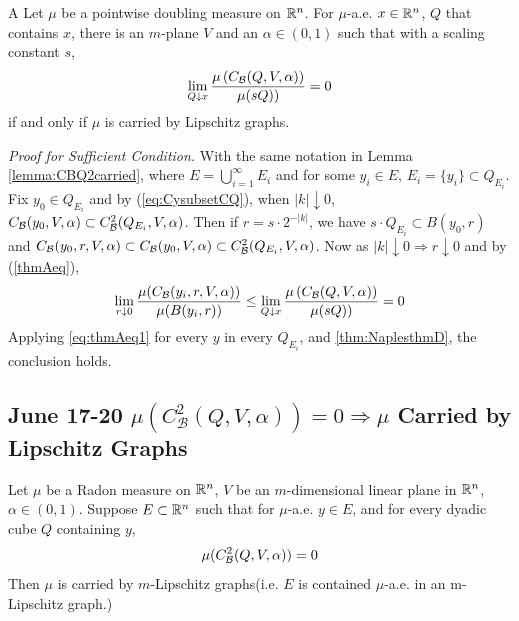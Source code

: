 \begin{customthm}{A}\label{thmA} 
    Let $\mu$ be a pointwise doubling measure on $\mathbb{R}^n$. For $\mu$-a.e. $x \in \mathbb{R}^n$, $Q$ that contains $x$, there is an $m$-plane $V$ and an $\alpha \in(0,1)$ such that with a scaling constant $s$,
    \begin{equation}\label{thmAeq}
        \lim_{Q \downarrow x} \frac{\mu\left(C_\mathcal B(Q, V, \alpha)\right)}{\mu(sQ))}=0
    \end{equation}
    if and only if $\mu$ is carried by Lipschitz graphs.
\end{customthm}
\textit{Proof for Sufficient Condition.} With the same notation in Lemma \ref{lemma:CBQ2carried}, where $E = \bigcup_{i=1}^\infty E_i$ and for some $y_i\in E$, $E_i=\{y_i\}\subset Q_{E_i}$. Fix $y_0\in Q_{E_i}$ and by (\ref{eq:CysubsetCQ}), when $|k|\downarrow 0$, $C_\mathcal B(y_0, V, \alpha)\subset C_\mathcal B^2(Q_{E_i}, V, \alpha)$. Then if $r=s\cdot 2^{-|k|}$, we have $s\cdot Q_{E_i}\subset B(y_0, r)$ and $C_\mathcal B(y_0, r, V, \alpha)\subset C_\mathcal B(y_0, V, \alpha)\subset C_\mathcal B^2(Q_{E_i}, V, \alpha)$. Now as $|k|\downarrow 0\Rightarrow r\downarrow 0$ and by (\ref{thmAeq}),
\begin{equation}\label{eq:thmAeq1}
    \lim_{r\downarrow 0} \frac{\mu(C_\mathcal B(y_i, r, V, \alpha))}{\mu(B(y_i, r))} \leq \lim_{Q \downarrow x} \frac{\mu\left(C_\mathcal B(Q, V, \alpha)\right)}{\mu(sQ))}=0
\end{equation} 
Applying \ref{eq:thmAeq1} for every $y$ in every $Q_{E_i}$, and \ref{thm:NaplesthmD}, the conclusion holds.




\newpage
\subsection{June 17-20 \texorpdfstring{$\mu(C_\mathcal{B}^2(Q, V, \alpha)) = 0 \Rightarrow \mu$ Carried by Lipschitz Graphs}{Lg}}

\begin{lemma}\label{lemma:CBQ2carried}
    Let $\mu$ be a Radon measure on $\mathbb{R}^n$, $V$ be an $m$-dimensional linear plane in $\mathbb{R}^n$, $\alpha\in(0,1)$. Suppose $E\subset \mathbb{R}^n$ such that for $\mu$-a.e. $y\in E$, and for every dyadic cube $Q$ containing $y$, 
    \begin{equation}\label{muB2=0}
        \mu(C_\mathcal B^2(Q, V, \alpha)) = 0
    \end{equation}
    Then $\mu$ is carried by $m$-Lipschitz graphs(i.e. $E$ is contained $\mu$-a.e. in an m-Lipschitz graph.)
\end{lemma}

